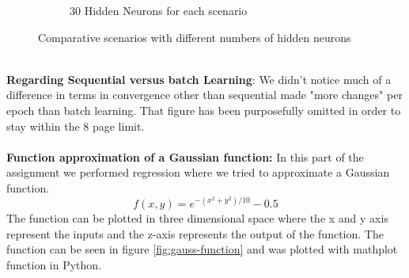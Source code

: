 \documentclass[a4paper]{article}
\begin{document}
\begin{figure}[!htb]
\begin{subfigure}[b]{0.48\textwidth}
        \caption{30 Hidden Neurons for each scenario}
        \label{fig: 30 hidden 3 scenarios}
    \end{subfigure}
    \caption{Comparative scenarios with different numbers of hidden neurons}
    \label{fig: comparative scenarios}
\end{figure}\\
\textbf{Regarding Sequential versus batch Learning}: We didn't notice much of a difference in terms in convergence other than sequential made "more changes" per epoch than batch learning. That figure has been purposefully omitted in order to stay within the 8 page limit.\\
\\\textbf{Function approximation of a Gaussian function:} In this part of the assignment we performed regression where we tried to approximate a Gaussian function. 
$$
f(x, y) = e^{-(x^2+y^2)/10} - 0.5
$$
The function can be plotted in three dimensional space where the x and y axis represent the inputs and the z-axis represents the output of the function. The function can be seen in figure \ref{fig:gauss-function} and was plotted with mathplot function in Python.
\end{document}
